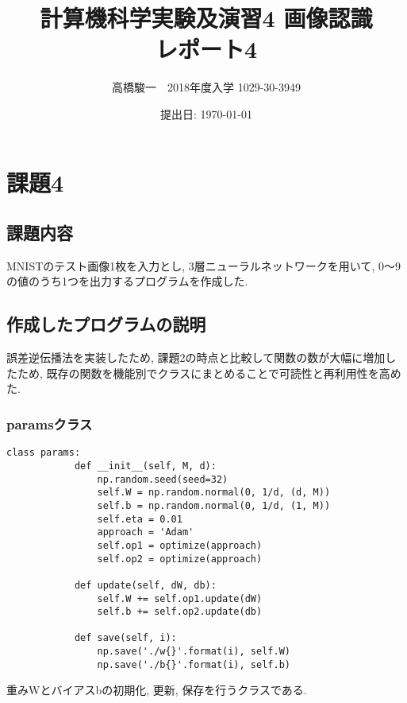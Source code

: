 \documentclass[a4j, titlepage]{jarticle}
\begin{document}
\title{計算機科学実験及演習4 画像認識　\\ \bf レポート4}
\author{高橋駿一　2018年度入学 1029-30-3949}
\date{提出日: \today} %
\maketitle

\clearpage

\section*{課題4}
\subsection*{課題内容}
MNISTのテスト画像1枚を入力とし, 3層ニューラルネットワークを用いて, 0～9の値のうち1つを出力するプログラムを作成した.

\subsection*{作成したプログラムの説明}
誤差逆伝播法を実装したため, 課題2の時点と比較して関数の数が大幅に増加したため, 既存の関数を機能別でクラスにまとめることで可読性と再利用性を高めた.
    \subsubsection{paramsクラス}
        \begin{lstlisting}[caption=パラメータW, bの初期化, 更新, 保存 ,label=fuga]
        class params:
            def __init__(self, M, d):
                np.random.seed(seed=32)
                self.W = np.random.normal(0, 1/d, (d, M))
                self.b = np.random.normal(0, 1/d, (1, M))
                self.eta = 0.01
                approach = 'Adam'
                self.op1 = optimize(approach)
                self.op2 = optimize(approach)

            def update(self, dW, db):
                self.W += self.op1.update(dW)
                self.b += self.op2.update(db)

            def save(self, i):
                np.save('./w{}'.format(i), self.W)
                np.save('./b{}'.format(i), self.b)
        \end{lstlisting}
        重みWとバイアスbの初期化, 更新, 保存を行うクラスである.
\end{document}
